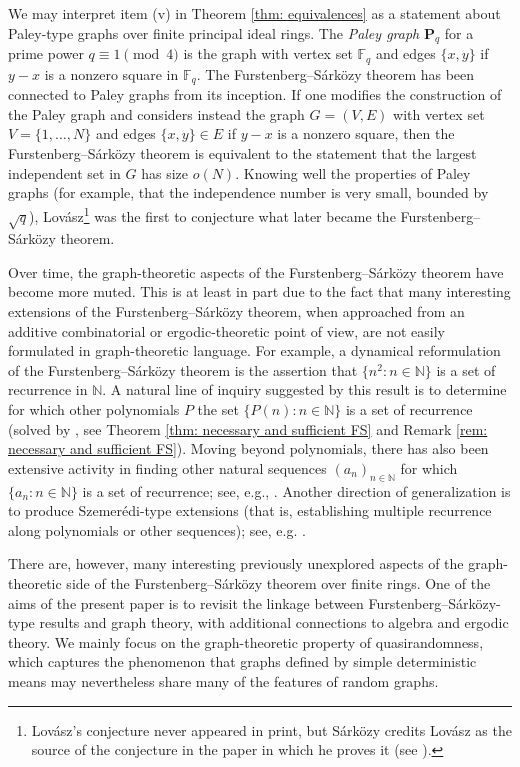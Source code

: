 \documentclass{amsart}
\theoremstyle{definition}
\numberwithin{equation}{section}
\newcommand{\N}{\mathbb{N}}
\newcommand{\F}{\mathbb{F}}
\newcommand{\bfP}{\mathbf{P}}
\begin{document}
We may interpret item (v) in Theorem \ref{thm: equivalences} as a statement about Paley-type graphs over finite principal ideal rings.
The \emph{Paley graph} $\bfP_q$ for a prime power $q \equiv 1 \pmod{4}$ is the graph with vertex set $\F_q$ and edges $\{x,y\}$ if $y - x$ is a nonzero square in $\F_q$.
The Furstenberg--S\'{a}rk\"{o}zy theorem has been connected to Paley graphs from its inception.
If one modifies the construction of the Paley graph and considers instead the graph $G = (V,E)$ with vertex set $V = \{1, \ldots, N\}$ and edges $\{x,y\} \in E$ if $y-x$ is a nonzero square, then the Furstenberg--S\'{a}rk\"{o}zy theorem is equivalent to the statement that the largest independent set in $G$ has size $o(N)$.
Knowing well the properties of Paley graphs (for example, that the independence number is very small, bounded by $\sqrt{q}$), Lov\'{a}sz\footnote{Lov\'{a}sz's conjecture never appeared in print, but S\'{a}rk\"{o}zy credits Lov\'{a}sz as the source of the conjecture in the paper in which he proves it (see \cite{sarkozy}).} was the first to conjecture what later became the Furstenberg--S\'{a}rk\"{o}zy theorem.

Over time, the graph-theoretic aspects of the Furstenberg--S\'{a}rk\"{o}zy theorem have become more muted.
This is at least in part due to the fact that many interesting extensions of the Furstenberg--S\'{a}rk\"{o}zy theorem, when approached from an additive combinatorial or ergodic-theoretic point of view, are not easily formulated in graph-theoretic language.
For example, a dynamical reformulation of the Furstenberg--S\'{a}rk\"{o}zy theorem is the assertion that $\{n^2 : n\in \N\}$ is a set of recurrence in $\N$.
A natural line of inquiry suggested by this result is to determine for which other polynomials $P$ the set $\{P(n) : n \in \N\}$ is a set of recurrence (solved by \cite{km}, see Theorem \ref{thm: necessary and sufficient FS} and Remark \ref{rem: necessary and sufficient FS}).
Moving beyond polynomials, there has also been extensive activity in finding other natural sequences $(a_n)_{n \in \N}$ for which $\{a_n : n\in\N\}$ is a set of recurrence; see, e.g., \cite{sarkozy_prime,bfm,bks}.
Another direction of generalization is to produce Szemer\'{e}di-type extensions (that is, establishing multiple recurrence along polynomials or other sequences); see, e.g. \cite{bl_polynomial_sz}.

There are, however, many interesting previously unexplored aspects of the graph-theoretic side of the Furstenberg--S\'{a}rk\"{o}zy theorem over finite rings.
One of the aims of the present paper is to revisit the linkage between Furstenberg--S\'{a}rk\"{o}zy-type results and graph theory, with additional connections to algebra and ergodic theory.
We mainly focus on the graph-theoretic property of quasirandomness, which captures the phenomenon that graphs defined by simple deterministic means may nevertheless share many of the features of random graphs.
\end{document}
